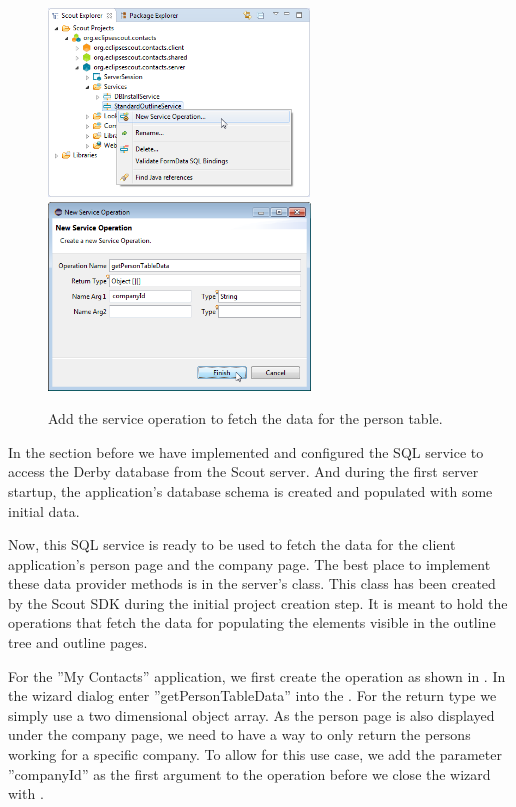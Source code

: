 \documentclass[a4paper,10pt,twoside]{book}
\begin{document}
\begin{figure}
\includegraphics[height=5cm]{new_service_persontabledata_contextmenu.png} \hspace{5mm}
\includegraphics[height=5cm]{new_service_persontabledata.png}
\caption{Add the service operation to fetch the data for the person table. }
\end{figure}

In the section before we have implemented and configured the SQL service to access the Derby database from the Scout server. 
And during the first server startup, the application's database schema is created and populated with some initial data. 

Now, this SQL service is ready to be used to fetch the data for the client application's person page and the company page. 
The best place to implement these data provider methods is in the server's  class. 
This class has been created by the Scout SDK during the initial project creation step.
It is meant to hold the operations that fetch the data for populating the elements visible in the outline tree and outline pages. 

For the ''My Contacts'' application, we first create the  operation as shown in . 
In the wizard dialog enter ''getPersonTableData'' into the . 
For the return type we simply use a two dimensional object array. 
As the person page is also displayed under the company page, we need to have a way to only return the persons working for a specific company. 
To allow for this use case, we add the parameter ''companyId'' as the first argument to the  operation before we close the wizard with . 
\end{document}
